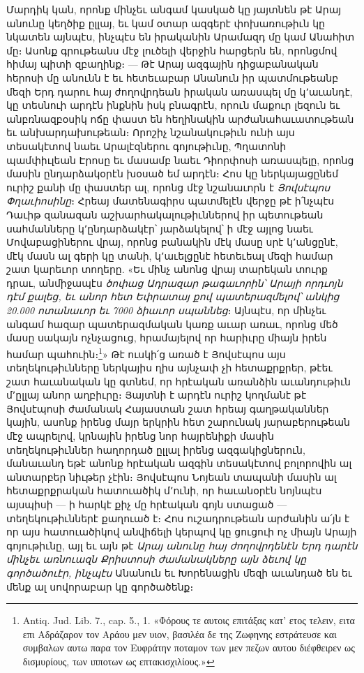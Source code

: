 \documentclass{article}
\begin{document}
{Մարդիկ կան, որոնք մինչեւ անգամ կասկած կը յայտնեն թէ Արայ անունը կեղծիք ըլլայ, եւ կամ օտար ազգերէ փոխառութիւն կը նկատեն այնպէս, ինչպէս են իրականին Արամազդ մը կամ Անահիտ մը։ Ասոնք գրութեանս մէջ լուծելի վերջին հարցերն են, որոնցմով հիմայ պիտի զբաղինք։ — Թէ Արայ ազգային դիցաբանական հերոսի մը անունն է եւ հետեւաբար Անանուն իր պատմութեանբ մեզի Երդ դարու հայ ժողովրդեան իրական առասպել մը կ՚աւանդէ, կը տեսնուի արդէն ինքնին իսկ բնագրէն, որուն մաքուր լեզուն եւ անբռնազբօսիկ ոճը փաստ են հեղինակին արժանահաւատութեան եւ անխարդախութեան։ Որոշիչ նշանակութիւն ունի այս տեսակէտով նաեւ Արալէզներու գոյութիւնը, Պղատոնի պամփիւլեան Էրոսը եւ մասամբ նաեւ Դիորփոսի առասպելը, որոնց մասին ընդարձակօրէն խօսած եմ արդէն։ Հոս կը ներկայացընեմ ուրիշ քանի մը փաստեր ալ, որոնց մէջ նշանաւորն է \emph{Յովսէպոս Փղաւիոսինը}։ Հրեայ մատենագիրս պատմելէն վերջը թէ ի՛նչպէս Դաւիթ զանազան աշխարհակալութիւններով իր պետութեան սահմանները կ՚ընդարձակէր՝ յարձակելով՝ ի մէջ այլոց նաեւ Մովաբացիներու վրայ, որոնց բանակին մէկ մասը սրէ կ՚անցընէ, մէկ մասն ալ գերի կը տանի, կ՚աւելցընէ հետեւեալ մեզի համար շատ կարեւոր տողերը. «Եւ մինչ անոնց վրայ տարեկան տուրք դրաւ, անմիջապէս \emph{ծոփաց Ադրազար թագաւորին՝ Արայի որդւոյն դէմ քալեց, եւ անոր հետ Եփրատայ քով պատերազմելով՝ անկից 20.000 ոտանաւոր եւ 7000 ձիաւոր սպաննեց}։ Այնպէս, որ մինչեւ անգամ հազար պատերազմական կառք աւար առաւ, որոնց մեծ մասը սակայն ոչնչացուց, հրամայելով որ հարիւրը միայն իրեն համար պահուին։\footnote{Antiq. Jud. Lib. 7., cap. 5., 1. «Φόρους τε αυτοις επιτάξας κατ' ετος τελειν, ειτα επι Αδράζαρον τον Αράου μεν υιον, βασιλέα δε της Ζωφηνης εστράτευσε και συμβαλων αυτω παρα τον Ευφράτην ποταμον των μεν πεζων αυτου διέφθειρεν ως δισμυρίους, των ιπποτων ως επτακισχιλίους.»}» Թէ ուսկի՛ց առած է Յովսէպոս այս տեղեկութիւնները ներկայիս ղիս այնչափ չի հետաքրքրեր, թէեւ շատ հաւանական կը գտնեմ, որ հրէական առանձին աւանդութիւն մ՚ըլլայ անոր աղբիւրը։ Յայտնի է արդէն ուրիշ կողմանէ թէ Յովսէպոսի ժամանակ Հայաստան շատ հրեայ գաղթականներ կային, ասոնք իրենց մայր երկրին հետ շարունակ յարաբերութեան մէջ ապրելով, կրնային իրենց նոր հայրենիքի մասին տեղեկութիւններ հաղորդած ըլլալ իրենց ազգակիցներուն, մանաւանդ եթէ անոնք հրէական ազգին տեսակէտով բոլորովին ալ անտարբեր նիւթեր չէին։ Յովսէպոս Նոյեան տապանի մասին ալ հետաքրքրական հատուածիկ մ՚ունի, որ հաւանօրէն նոյնպէս այսպիսի — ի հարկէ քիչ մը հրէական գոյն ստացած — տեղեկութիւններէ քաղուած է։ Հոս ուշադրութեան արժանին ա՛յն է որ այս հատուածիկով անվիճելի կերպով կը ցուցուի ոչ միայն Արայի գոյութիւնը, այլ եւ այն թէ \emph{Արայ անունը հայ ժողովրդենէն Երդ դարէն մինչեւ առնուազն Քրիստոսի ժամանակները այն ձեւով կը գործածուէր, ինչպէս} Անանուն եւ Խորենացին մեզի աւանդած են եւ մենք ալ սովորաբար կը գործածենք։

}
\end{document}
